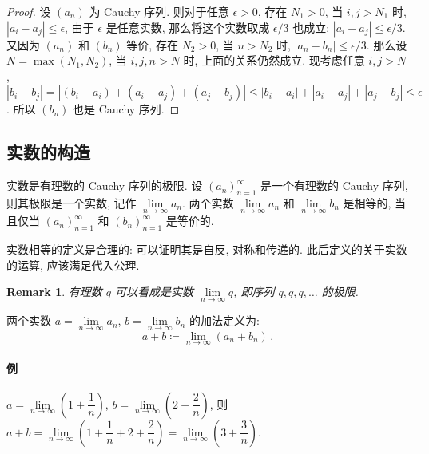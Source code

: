 \documentclass[UTF8]{ctexart}
\theoremstyle{mystyle}
\theoremstyle{myremark}
\newtheorem*{remark}{Remark}
\theoremstyle{plain}
\begin{document}
\begin{proof}
    设 $ (a_n) $ 为 Cauchy 序列. 则对于任意 $ \epsilon > 0 $, 存在 $ N_1 > 0 $, 当 $ i, j > N_1 $ 时, $ |a_i - a_j| \leqslant \epsilon $, 由于 $ \epsilon $ 是任意实数, 那么将这个实数取成 $ \epsilon/3 $ 也成立: $ |a_i - a_j| \leqslant \epsilon/3 $. 又因为 $ (a_n) $ 和 $ (b_n) $ 等价, 存在 $ N_2 > 0 $, 当 $ n > N_2 $ 时, $ |a_n - b_n| \leqslant \epsilon/3 $. 那么设 $ N = \max(N_1, N_2) $, 当 $ i, j, n > N $ 时, 上面的关系仍然成立. 现考虑任意 $ i, j > N $, $ |b_i - b_j| = |(b_i - a_i) + (a_i - a_j) + (a_j - b_j)| \leqslant |b_i - a_i| + |a_i - a_j| + |a_j - b_j| \leqslant \epsilon $. 所以 $ (b_n) $ 也是 Cauchy 序列.
\end{proof}


\subsection{实数的构造}
\begin{definition}[\text{实数}]
    实数是有理数的 Cauchy 序列的极限. 设 $ (a_n)_{n = 1}^\infty $ 是一个有理数的 Cauchy 序列, 则其极限是一个实数, 记作 $ \lim\limits_{n \to \infty} a_n $. 两个实数 $ \lim\limits_{n \to \infty} a_n $ 和 $ \lim\limits_{n \to \infty} b_n $ 是相等的, 当且仅当 $ (a_n)_{n = 1}^\infty $ 和 $ (b_n)_{n = 1}^\infty $ 是等价的.
\end{definition}

实数相等的定义是合理的: 可以证明其是自反, 对称和传递的. 此后定义的关于实数的运算, 应该满足代入公理.

\begin{remark}
    有理数 $ q $ 可以看成是实数 $ \lim\limits_{n \to \infty} q $, 即序列 $ q, q, q, \dots $ 的极限.
\end{remark}

\begin{definition}
    两个实数 $ a = \lim\limits_{n \to \infty} a_n $, $ b = \lim\limits_{n \to \infty} b_n $ 的加法定义为: \[ a + b \coloneqq \lim\limits_{n \to \infty} (a_n + b_n) \,.\]
\end{definition}

\paragraph{例}
$ a = \lim\limits_{n \to \infty} \left( 1 + \dfrac{1}{n} \right) $, $ b = \lim\limits_{n \to \infty} \left( 2 + \dfrac{2}{n} \right) $, 则 $ a + b = \lim\limits_{n \to \infty} \left( 1 + \dfrac{1}{n} + 2 + \dfrac{2}{n} \right) = \lim\limits_{n \to \infty} \left( 3 + \dfrac{3}{n} \right) $.
\end{document}
